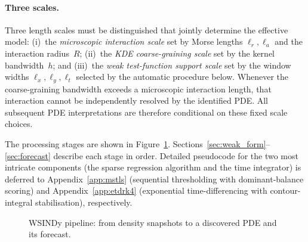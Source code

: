 \paragraph{Three scales.}
Three length scales must be distinguished that jointly determine
the effective model:
(i)~the \emph{microscopic interaction scale} set by Morse lengths
$\ell_r, \ell_a$ and the interaction radius~$R$;
(ii)~the \emph{KDE coarse-graining scale} set by the kernel bandwidth~$h$;
and
(iii)~the \emph{weak test-function support scale} set by the window
widths $\ell_x, \ell_y, \ell_t$ selected by the automatic procedure below.
Whenever the coarse-graining bandwidth exceeds a microscopic
interaction length, that interaction cannot be independently resolved by
the identified PDE\@.  All subsequent PDE interpretations are therefore
conditional on these fixed scale choices.

The processing stages are shown in Figure~\ref{fig:wsindy_pipeline_flow}.
Sections~\ref{sec:weak_form}--\ref{sec:forecast} describe each stage
in order.
Detailed pseudocode for the two most intricate components (the sparse
regression algorithm and the time integrator) is deferred to
Appendix~\ref{app:mstls} (sequential thresholding with dominant-balance
scoring) and Appendix~\ref{app:etdrk4} (exponential time-differencing
with contour-integral stabilisation), respectively.

\begin{figure}[htbp]
\centering
{}
\caption{WSINDy pipeline: from density snapshots to a discovered PDE and its forecast.}
\label{fig:wsindy_pipeline_flow}
\end{figure}

